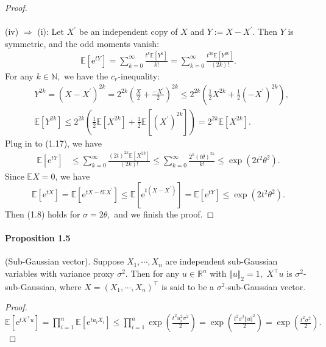 \documentclass{article}
\newcommand{\E}{\mathbb{E}}
\begin{document}
\begin{proof}
\paragraph{} (iv) $\Rightarrow$ (i): Let $X^\prime$ be an independent copy of $X$ and $Y:=X-X^\prime.$ Then $Y$ is symmetric, and the odd moments vanish:
\begin{align*}
	\E[\mathrm{e}^{tY}] = \sum_{k=0}^\infty\frac{t^{k}\E[Y^k]}{k!} = \sum_{k=0}^\infty\frac{t^{2k}\E[Y^{2k}]}{(2k)!}.\tag{1.17}
\end{align*}
For any $k\in\mathbb{N},$ we have the $c_r$-inequality:
\begin{align*}
	&Y^{2k}=(X-X^\prime)^{2k} = 2^{2k}\left(\frac{X}{2} + \frac{-X^\prime}{2}\right)^{2k}\leq 2^{2k}\left(\frac{1}{2}X^{2k} + \frac{1}{2}(-X^\prime)^{2k}\right),\tag{1.18}\\
	&\E[Y^{2k}] \leq 2^{2k}\left(\frac{1}{2}\E[X^{2k}] + \frac{1}{2}\E[(X^\prime)^{2k}]\right) = 2^{2k}\E[X^{2k}].\tag{1.19}
\end{align*}
Plug in to (1.17), we have
\begin{align*}
	\E[\mathrm{e}^{tY}] &\leq \sum_{k=0}^\infty\frac{(2t)^{2k}\E[X^{2k}]}{(2k)!}
	\leq \sum_{k=0}^\infty\frac{2^k(t\theta)^{2k}}{k!}\leq\exp\left(2t^2\theta^2\right).\tag{1.20}
\end{align*}
Since $\E X=0$, we have
\begin{equation*}
	\E[\mathrm{e}^{tX}] = \E[\mathrm{e}^{tX-t\E X^\prime}]\leq \E[\mathrm{e}^{t(X-X^\prime)}] = \E[\mathrm{e}^{tY}]\leq \exp\left(2t^2\theta^2\right).\tag{1.21}
\end{equation*}
Then (1.8) holds for $\sigma=2\theta,$ and we finish the proof.
\end{proof}

\paragraph{Proposition 1.5} (Sub-Gaussian vector). Suppose $X_1,\cdots,X_n$ are independent sub-Gaussian variables with variance proxy $\sigma^2.$ Then for any $u\in\mathbb{R}^n$ with $\Vert u\Vert_2=1,$ $X^\top u$ is $\sigma^2$-sub-Gaussian, where $X=(X_1,\cdots,X_n)^\top$ is said to be a $\sigma^2$-sub-Gaussian vector.
\begin{proof} 
	$\displaystyle \E\left[\mathrm{e}^{tX^\top u}\right] = \prod_{i=1}^n\E\left[\mathrm{e}^{tu_iX_i}\right]\leq \prod_{i=1}^n\exp\left(\frac{t^2u_i^2\sigma^2}{2}\right) = \exp\left(\frac{t^2\sigma^2\Vert u\Vert^2}{2}\right) = \exp\left(\frac{t^2\sigma^2}{2}\right).$
\end{proof}
\end{document}
